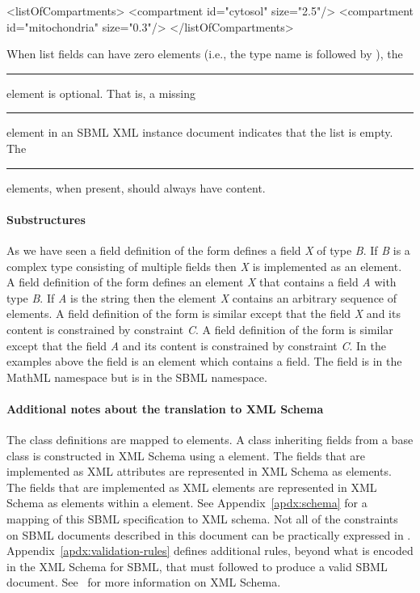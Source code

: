 \begin{example}
<listOfCompartments>
    <compartment id="cytosol" size="2.5"/>
    <compartment id="mitochondria" size="0.3"/>
</listOfCompartments>
\end{example}

When list fields can have zero elements (i.e., the type name is
followed by \token{[0..*]}), the
\rule{0.5in}{0.5pt} element is optional.
That is, a missing \rule{0.5in}{0.5pt} element in an
SBML XML instance document indicates that the list is empty.  The
\rule{0.5in}{0.5pt} elements, when present, should
always have content.


\paragraph{Substructures}

As we have seen a field definition of the form 
defines a field \emph{X} of type \emph{B}.  If \emph{B} is a
complex type consisting of multiple fields then \emph{X} is
implemented as an element.  A field definition of the form
 defines an element \emph{X} that contains a
field \emph{A} with type \emph{B}.  If \emph{A} is the string
 then the element \emph{X} contains an arbitrary
sequence of elements. A field definition of the form  is similar except that the field \emph{X} and its
content is constrained by constraint \emph{C}. A field definition
of the form  is similar except that
the field \emph{A} and its content is constrained by constraint
\emph{C}. In the examples above the field  is an
element which contains a  field.  The 
field is in the MathML namespace but  is in the SBML
namespace.


\paragraph{Additional notes about the translation to XML Schema}

The class definitions are mapped to \xmlschemaone
{} elements.  A class inheriting fields from a
base class is constructed in XML Schema using a 
element.  The fields that are implemented as XML attributes are
represented in XML Schema as  elements. The
fields that are implemented as XML elements are represented in XML
Schema as  elements within a 
element.  See Appendix~\ref{apdx:schema} for a mapping of this SBML
specification to XML schema.  Not all of the constraints on SBML
documents described in this document can be practically expressed
in \xmlschemaone. Appendix~\ref{apdx:validation-rules} defines
additional rules, beyond what is encoded in the XML Schema for
SBML, that must followed to produce a valid SBML document.
See~\cite{walmsley:2002} for more information on XML Schema.
